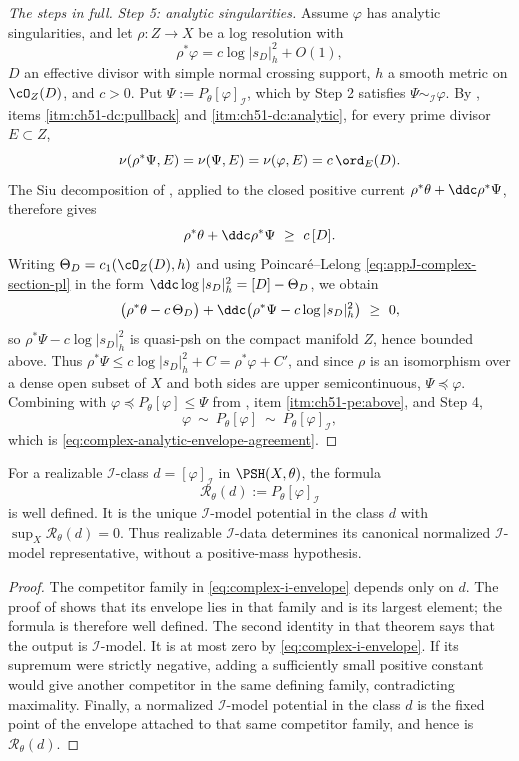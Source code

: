 \begin{proof}[The steps in full]
\emph{Step 5: analytic singularities.}  Assume \(\varphi\) has analytic
singularities, and let \(\rho:Z\to X\) be a log resolution with
\[
 \rho^*\varphi=c\log|s_D|_h^2+O(1),
\]
\(D\) an effective divisor with simple normal crossing support, \(h\) a
smooth metric on \(\cO_Z(D)\), and \(c>0\).  Put
\(\Psi:=P_\theta[\varphi]_{\mathcal I}\), which by Step 2 satisfies
\(\Psi\sim_{\mathcal I}\varphi\).  By
, items
\cref{itm:ch51-dc:pullback} and \cref{itm:ch51-dc:analytic}, for every
prime divisor \(E\subset Z\),
\[
 \nu(\rho^*\Psi,E)=\nu(\Psi,E)=\nu(\varphi,E)=c\,\ord_E(D).
\]
The Siu decomposition of , applied to the
closed positive current \(\rho^*\theta+\ddc\rho^*\Psi\), therefore gives
\[
 \rho^*\theta+\ddc\rho^*\Psi\ \geq\ c\,[D].
\]
Writing \(\Theta_D=c_1(\cO_Z(D),h)\) and using Poincar\'e--Lelong
\eqref{eq:appJ-complex-section-pl} in the form
\(\ddc\log|s_D|_h^2=[D]-\Theta_D\), we obtain
\[
 \bigl(\rho^*\theta-c\,\Theta_D\bigr)
 +\ddc\bigl(\rho^*\Psi-c\log|s_D|_h^2\bigr)\ \geq\ 0 ,
\]
so \(\rho^*\Psi-c\log|s_D|_h^2\) is quasi-psh on the compact manifold
\(Z\), hence bounded above.  Thus
\(\rho^*\Psi\leq c\log|s_D|_h^2+C=\rho^*\varphi+C'\), and since \(\rho\)
is an isomorphism over a dense open subset of \(X\) and both sides are
upper semicontinuous, \(\Psi\preceq\varphi\).  Combining with
\(\varphi\preceq P_\theta[\varphi]\leq\Psi\) from
, item \cref{itm:ch51-pe:above}, and Step 4,
\[
 \varphi\ \sim\ P_\theta[\varphi]\ \sim\ P_\theta[\varphi]_{\mathcal I},
\]
which is \eqref{eq:complex-analytic-envelope-agreement}.
\end{proof}

\begin{corollary}
\label{cor:ch51-i-canonical-reconstruction}
For a realizable \(\mathcal I\)-class
\(d=[\varphi]_{\mathcal I}\) in \(\PSH(X,\theta)\), the formula
\[
 \mathcal R_\theta(d):=P_\theta[\varphi]_{\mathcal I}
\]
is well defined.  It is the unique \(\mathcal I\)-model potential in the
class \(d\) with \(\sup_X\mathcal R_\theta(d)=0\).  Thus realizable
\(\mathcal I\)-data determines its canonical normalized
\(\mathcal I\)-model representative, without a positive-mass hypothesis.
\end{corollary}

\begin{proof}
The competitor family in \eqref{eq:complex-i-envelope} depends only on
\(d\).  The proof of  shows that its
envelope lies in that family and is its largest element; the formula is
therefore well defined.  The second identity in that theorem says that the
output is \(\mathcal I\)-model.  It is at most zero by
\eqref{eq:complex-i-envelope}.  If its supremum were strictly negative,
adding a sufficiently small positive constant would give another competitor
in the same defining family, contradicting maximality.  Finally, a
normalized \(\mathcal I\)-model potential in the class \(d\) is the fixed
point of the envelope attached to that same competitor family, and hence is
\(\mathcal R_\theta(d)\).
\end{proof}


